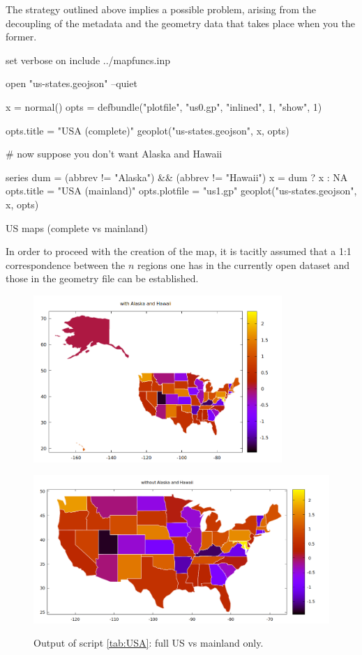 \documentclass[a4paper]{article}
\begin{document}
The strategy outlined above implies a possible problem, arising from
the decoupling of the metadata and the geometry data that takes place
when you  the former.

\begin{table}[htbp]
  \begin{scode}
set verbose on
include ../mapfuncs.inp

open "us-states.geojson" --quiet

x = normal()
opts = defbundle("plotfile", "us0.gp", "inlined", 1, "show", 1)

opts.title = "USA (complete)"
geoplot("us-states.geojson", x, opts)

# now suppose you don't want Alaska and Hawaii

series dum = (abbrev != "Alaska") && (abbrev != "Hawaii")
x = dum ? x : NA
opts.title = "USA (mainland)"
opts.plotfile = "us1.gp"
geoplot("us-states.geojson", x, opts)
  \end{scode}
  \caption{US maps (complete vs mainland)}
  \label{tab:USA}
\end{table}

In order to proceed with the creation of the map, it is tacitly
assumed that a 1:1 correspondence between the $n$ regions one has in
the currently open dataset and those in the geometry file can be
established.

\begin{figure}[htbp]
  \begin{center}
  \includegraphics[height=180pt]{us0.png}

  \includegraphics[height=180pt]{us1.png}  
\end{center}
\caption{Output of script \ref{tab:USA}: full US vs mainland only.}
\label{fig:USA}
\end{figure}
\end{document}
